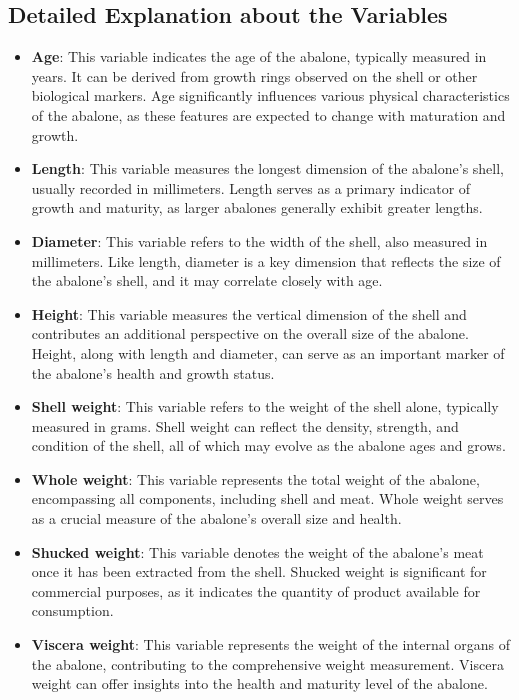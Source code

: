 \documentclass{article}
\begin{document}
\subsection{Detailed Explanation about the Variables}
\begin{itemize}
\item \textbf{Age}: This variable indicates the age of the abalone, typically measured in years. It can be derived from growth rings observed on the shell or other biological markers. Age significantly influences various physical characteristics of the abalone, as these features are expected to change with maturation and growth.

\item \textbf{Length}: This variable measures the longest dimension of the abalone's shell, usually recorded in millimeters. Length serves as a primary indicator of growth and maturity, as larger abalones generally exhibit greater lengths.

\item \textbf{Diameter}: This variable refers to the width of the shell, also measured in millimeters. Like length, diameter is a key dimension that reflects the size of the abalone's shell, and it may correlate closely with age.

\item \textbf{Height}: This variable measures the vertical dimension of the shell and contributes an additional perspective on the overall size of the abalone. Height, along with length and diameter, can serve as an important marker of the abalone's health and growth status.

\item \textbf{Shell weight}: This variable refers to the weight of the shell alone, typically measured in grams. Shell weight can reflect the density, strength, and condition of the shell, all of which may evolve as the abalone ages and grows.

\item \textbf{Whole weight}: This variable represents the total weight of the abalone, encompassing all components, including shell and meat. Whole weight serves as a crucial measure of the abalone's overall size and health.

\item \textbf{Shucked weight}: This variable denotes the weight of the abalone's meat once it has been extracted from the shell. Shucked weight is significant for commercial purposes, as it indicates the quantity of product available for consumption.

\item \textbf{Viscera weight}: This variable represents the weight of the internal organs of the abalone, contributing to the comprehensive weight measurement. Viscera weight can offer insights into the health and maturity level of the abalone.
\end{itemize}
\end{document}

